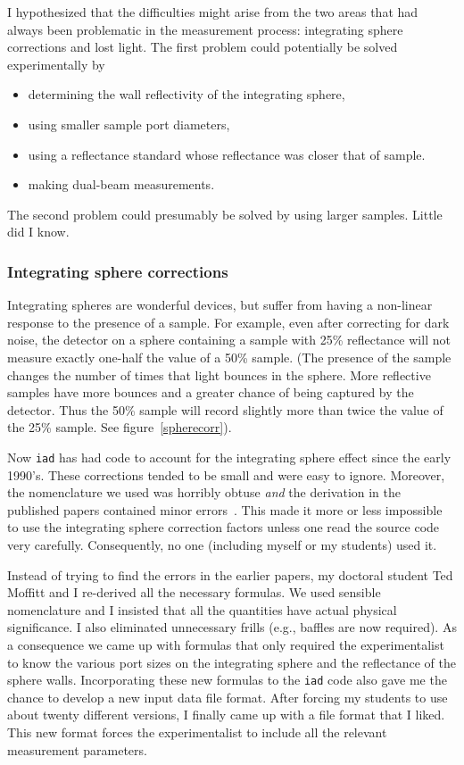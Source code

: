\documentclass{article}
\newcommand\iadprog{\texttt{iad}}
\begin{document}
I hypothesized that the difficulties might arise from the two areas that had
always been problematic in the measurement process: integrating sphere corrections and lost light.
The first problem could potentially be solved experimentally by 
\begin{itemize}
\item determining the wall reflectivity of the integrating sphere, 
\item using smaller sample port diameters, 
\item using a reflectance standard whose reflectance was closer that of sample. 
\item making dual-beam measurements.
\end{itemize}
The second problem could presumably be solved
by using larger samples.  Little did I know.

\subsubsection*{Integrating sphere corrections}

Integrating spheres are wonderful devices, but 
suffer from having a non-linear response to the presence of a sample.  For 
example, even after correcting for dark noise, the detector on a sphere 
containing a sample with 25\% reflectance will not measure exactly one-half 
the value of a 50\% sample. (The presence of the sample changes the number
of times that light bounces in the sphere.  More reflective samples have
more bounces and a greater chance of being captured by the detector.  Thus
the 50\% sample will record slightly more than twice the value of the
25\% sample.  See figure~\ref{spherecorr}).

Now \iadprog{} has had code to account for the integrating sphere effect since
the early 1990's.  These
corrections tended to be small and were easy to ignore.  Moreover,
the nomenclature we used was horribly obtuse \textit{and} the derivation in the published
papers contained minor errors~\cite{pickering93a}.  This made it more or less impossible
to use the integrating sphere correction factors unless one read the source
code very carefully.  Consequently, no one (including myself or my students)
used it.  

Instead of trying to find the errors in the earlier papers, my doctoral
student Ted Moffitt and I re-derived all the necessary formulas.  We used
sensible nomenclature and I insisted that all the quantities have actual
physical significance.  I also eliminated unnecessary frills (e.g., baffles
are now required).  As a consequence we came up with formulas that 
only required the experimentalist to know the various port sizes on the
integrating sphere and the reflectance of the sphere walls.  
Incorporating these new formulas to the \iadprog{} code also gave me the chance
to develop a new input data file format.  After forcing my students to use about 
twenty different versions,
I finally came up with a file format that I liked.  This new format forces
the experimentalist to include all the relevant measurement parameters.  
\end{document}
